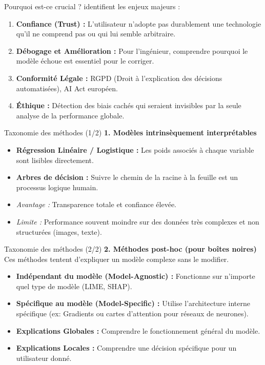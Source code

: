 \documentclass[9pt, aspectratio=169]{beamer}
\begin{document}
\begin{frame}{Pourquoi est-ce crucial ?}
    \cite{Burkart2021} identifient les enjeux majeurs :
    \begin{enumerate}
        \item \textbf{Confiance (Trust) :} L'utilisateur n'adopte pas durablement une technologie qu'il ne comprend pas ou qui lui semble arbitraire.
        \item \textbf{Débogage et Amélioration :} Pour l'ingénieur, comprendre pourquoi le modèle échoue est essentiel pour le corriger.
        \item \textbf{Conformité Légale :} RGPD (Droit à l'explication des décisions automatisées), AI Act européen.
        \item \textbf{Éthique :} Détection des biais cachés qui seraient invisibles par la seule analyse de la performance globale.
    \end{enumerate}
\end{frame}

\begin{frame}{Taxonomie des méthodes (1/2)}
    \textbf{1. Modèles intrinsèquement interprétables}
    \begin{itemize}
        \item \textbf{Régression Linéaire / Logistique :} Les poids associés à chaque variable sont lisibles directement.
        \item \textbf{Arbres de décision :} Suivre le chemin de la racine à la feuille est un processus logique humain.
        \item \textit{Avantage :} Transparence totale et confiance élevée.
        \item \textit{Limite :} Performance souvent moindre sur des données très complexes et non structurées (images, texte).
    \end{itemize}
\end{frame}

\begin{frame}{Taxonomie des méthodes (2/2)}
    \textbf{2. Méthodes post-hoc (pour boîtes noires)}
    \vspace{0.3cm}
    Ces méthodes tentent d'expliquer un modèle complexe sans le modifier.
    \begin{itemize}
        \item \textbf{Indépendant du modèle (Model-Agnostic) :} Fonctionne sur n'importe quel type de modèle (LIME, SHAP).
        \item \textbf{Spécifique au modèle (Model-Specific) :} Utilise l'architecture interne spécifique (ex: Gradients ou cartes d'attention pour réseaux de neurones).
        \item \textbf{Explications Globales :} Comprendre le fonctionnement général du modèle.
        \item \textbf{Explications Locales :} Comprendre une décision spécifique pour un utilisateur donné.
    \end{itemize}
\end{frame}
\end{document}
